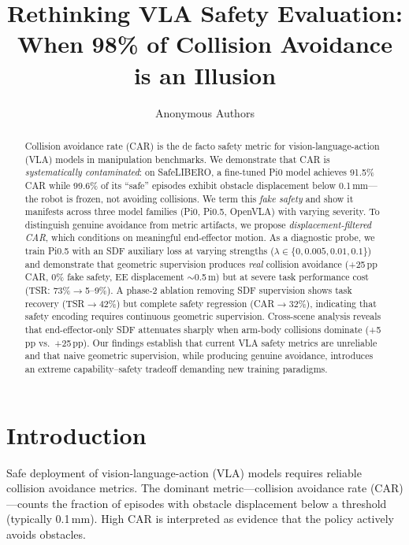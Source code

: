 \documentclass[10pt,twocolumn]{article}
\title{Rethinking VLA Safety Evaluation:\\When 98\% of Collision Avoidance is an Illusion}
\author{
  Anonymous Authors
}
\begin{document}
\maketitle

\begin{abstract}
Collision avoidance rate (CAR) is the de facto safety metric for vision-language-action (VLA) models in manipulation benchmarks. We demonstrate that CAR is \emph{systematically contaminated}: on SafeLIBERO, a fine-tuned Pi0 model achieves 91.5\% CAR while 99.6\% of its ``safe'' episodes exhibit obstacle displacement below 0.1\,mm---the robot is frozen, not avoiding collisions. We term this \emph{fake safety} and show it manifests across three model families (Pi0, Pi0.5, OpenVLA) with varying severity. To distinguish genuine avoidance from metric artifacts, we propose \emph{displacement-filtered CAR}, which conditions on meaningful end-effector motion. As a diagnostic probe, we train Pi0.5 with an SDF auxiliary loss at varying strengths ($\lambda \in \{0, 0.005, 0.01, 0.1\}$) and demonstrate that geometric supervision produces \emph{real} collision avoidance (+25\,pp CAR, 0\% fake safety, EE displacement $\sim$0.5\,m) but at severe task performance cost (TSR: 73\%$\to$5--9\%). A phase-2 ablation removing SDF supervision shows task recovery (TSR$\to$42\%) but complete safety regression (CAR$\to$32\%), indicating that safety encoding requires continuous geometric supervision. Cross-scene analysis reveals that end-effector-only SDF attenuates sharply when arm-body collisions dominate (+5\,pp vs.\ +25\,pp). Our findings establish that current VLA safety metrics are unreliable and that naive geometric supervision, while producing genuine avoidance, introduces an extreme capability--safety tradeoff demanding new training paradigms.
\end{abstract}

\section{Introduction}
\label{sec:intro}

Safe deployment of vision-language-action (VLA) models requires reliable collision avoidance metrics. The dominant metric---collision avoidance rate (CAR)---counts the fraction of episodes with obstacle displacement below a threshold (typically 0.1\,mm). High CAR is interpreted as evidence that the policy actively avoids obstacles.
\end{document}
